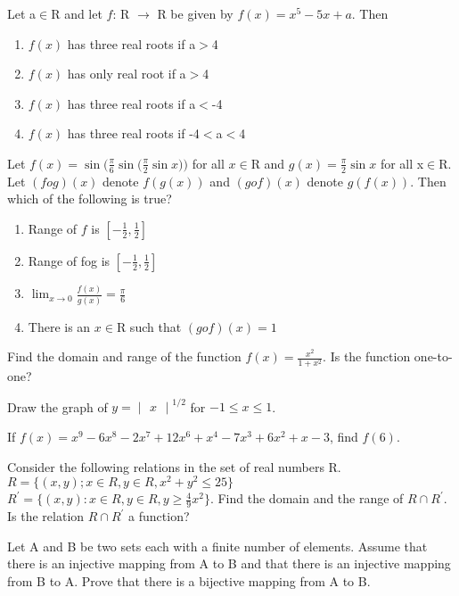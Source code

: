 \item Let a$\in$R and let $f$: R $\rightarrow$ R be given by $f(x)=x^5-5x+a$. Then
\begin{enumerate}
\item $f(x)$ has three real roots if a$>$4
\item $f(x)$ has only real root if a$>$4
\item $f(x)$ has three real roots if a$<$-4
\item $f(x)$ has three real roots if -4$<$a$<$4
\end{enumerate}

\item Let $f(x)=\sin\Big(\frac{\pi}{6}\sin\Big(\frac{\pi}{2}\sin x\Big)\Big)$ for all $x\in$R and $g(x)=\frac{\pi}{2}\sin x$ for all x$\in$R. Let $(fog)(x)$ denote $f(g(x))$ and $(gof)(x)$ denote $g(f(x)).$ Then which of the following is true?
\begin{enumerate}
\item Range of $f$ is $[-\frac{1}{2},\frac{1}{2}]$
\item Range of fog is $[-\frac{1}{2},\frac{1}{2}]$
\item $\lim_{x \to 0}\frac{f(x)}{g(x)}=\frac{\pi}{6}$
\item There is an $x\in$R such that $(gof)(x)=1$
\end{enumerate}

\item Find the domain and range of the function $f(x)=\frac{x^2}{1+x^2}.$ Is the function one-to-one?

\item Draw the graph of $y = \begin{vmatrix} x \end{vmatrix}^{1/2}$ for $-1 \leq x \leq 1$.

\item If $f(x)=x^{9}-6x^{8}-2x^{7}+12x^{6}+x^{4}-7x^{3}+6x^{2}+x-3$, find $f(6)$.

\item Consider the following relations in the set of real numbers R. $R = \{(x,y);x \in R, y\in R, x^2+y^2 \leq 25\}$\\
$R^{'} = \{(x,y):x \in R, y \in R, y \geq \frac{4}{9}x^2\}$. Find the domain and the range of $R \cap R^{'}$. Is the relation $R \cap R^{'}$ a function?

\item Let A and B be two sets each with a finite number of elements. Assume that there is an injective mapping from A to B and that there is an injective mapping from B to A. Prove that there is a bijective mapping from A to B.

